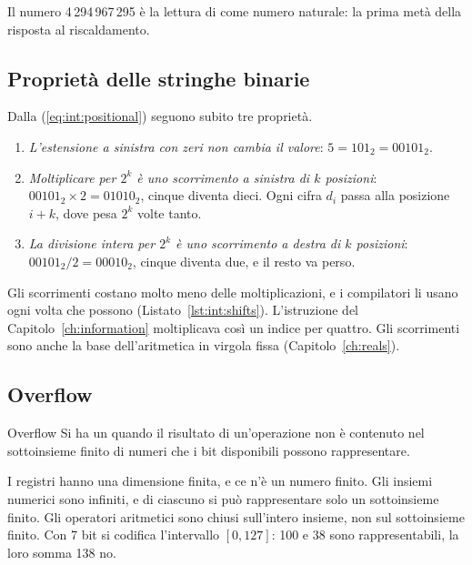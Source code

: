 Il numero 4\,294\,967\,295 è la lettura di  come numero naturale:
la prima metà della risposta al riscaldamento.

\subsection{Proprietà delle stringhe binarie}

Dalla (\ref{eq:int:positional}) seguono subito tre proprietà.

\begin{enumerate}
\item \emph{L'estensione a sinistra con zeri non cambia il valore}:
  $5 = 101_2 = 00101_2$.
\item \emph{Moltiplicare per $2^{k}$ è uno scorrimento a sinistra di $k$
  posizioni}: $00101_2\times 2 = 01010_2$, cinque diventa dieci. Ogni cifra
  $d_i$ passa alla posizione $i+k$, dove pesa $2^{k}$ volte tanto.
\item \emph{La divisione intera per $2^{k}$ è uno scorrimento a destra di $k$
  posizioni}: $00101_2/2 = 00010_2$, cinque diventa due, e il resto va perso.
\end{enumerate}

Gli scorrimenti costano molto meno delle moltiplicazioni, e i compilatori li
usano ogni volta che possono (Listato~\ref{lst:int:shifts}). L'istruzione
 del Capitolo~\ref{ch:information} moltiplicava così un
indice per quattro. Gli scorrimenti sono anche la base dell'aritmetica in
virgola fissa (Capitolo~\ref{ch:reals}).


\subsection{Overflow}

\begin{definition}{Overflow}
Si ha un  quando il risultato di un'operazione non è contenuto
nel sottoinsieme finito di numeri che i bit disponibili possono rappresentare.
\end{definition}

I registri hanno una dimensione finita, e ce n'è un numero finito. Gli insiemi
numerici sono infiniti, e di ciascuno si può rappresentare solo un sottoinsieme
finito. Gli operatori aritmetici sono chiusi sull'intero insieme, non sul
sottoinsieme finito. Con 7 bit si codifica l'intervallo $[0,127]$: 100 e 38
sono rappresentabili, la loro somma 138 no.

